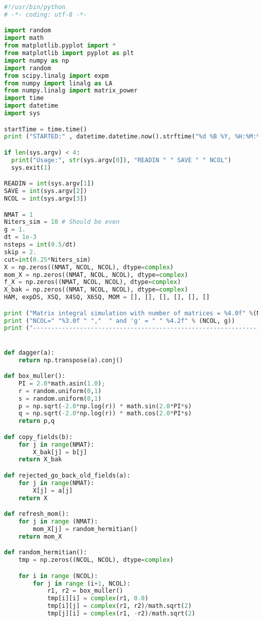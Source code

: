 \begin{footnotesize} 
\begin{lstlisting}[language=Python]
#!/usr/bin/python
# -*- coding: utf-8 -*-

import random
import math
from matplotlib.pyplot import *
from matplotlib import pyplot as plt
import numpy as np
import random
from scipy.linalg import expm
from numpy import linalg as LA
from numpy.linalg import matrix_power
import time 
import datetime 
import sys

startTime = time.time()
print ("STARTED:" , datetime.datetime.now().strftime("%d %B %Y, %H:%M:%S"))

if len(sys.argv) < 4:
  print("Usage:", str(sys.argv[0]), "READIN " " SAVE " " NCOL")
  sys.exit(1)

READIN = int(sys.argv[1])
SAVE = int(sys.argv[2])
NCOL = int(sys.argv[3]) 

NMAT = 1
Niters_sim = 10 # Should be even
g = 1.
dt = 1e-3
nsteps = int(0.5/dt) 
skip = 2.
cut=int(0.25*Niters_sim) 
X = np.zeros((NMAT, NCOL, NCOL), dtype=complex)
mom_X = np.zeros((NMAT, NCOL, NCOL), dtype=complex)
f_X = np.zeros((NMAT, NCOL, NCOL), dtype=complex)
X_bak = np.zeros((NMAT, NCOL, NCOL), dtype=complex)
HAM, expDS, XSQ, X4SQ, X6SQ, MOM = [], [], [], [], [], []

print ("Matrix integral simulation with number of matrices = %4.0f" %(NMAT)) 
print ("NCOL=" "%3.0f " ","  " and 'g' = " " %4.2f" % (NCOL, g)) 
print ("---------------------------------------------------------------------------------")


def dagger(a):
    return np.transpose(a).conj()

def box_muller():  
    PI = 2.0*math.asin(1.0);    
    r = random.uniform(0,1)
    s = random.uniform(0,1)
    p = np.sqrt(-2.0*np.log(r)) * math.sin(2.0*PI*s)
    q = np.sqrt(-2.0*np.log(r)) * math.cos(2.0*PI*s)
    return p,q

def copy_fields(b):
    for j in range(NMAT):
        X_bak[j] = b[j]
    return X_bak

def rejected_go_back_old_fields(a):
    for j in range(NMAT):
        X[j] = a[j]
    return X

def refresh_mom():
    for j in range (NMAT):
        mom_X[j] = random_hermitian()
    return mom_X

def random_hermitian():
    tmp = np.zeros((NCOL, NCOL), dtype=complex)

    for i in range (NCOL):
        for j in range (i+1, NCOL):
            r1, r2 = box_muller()
            tmp[i][i] = complex(r1, 0.0)
            tmp[i][j] = complex(r1, r2)/math.sqrt(2)
            tmp[j][i] = complex(r1, -r2)/math.sqrt(2)


\end{lstlisting}
\end{footnotesize}

